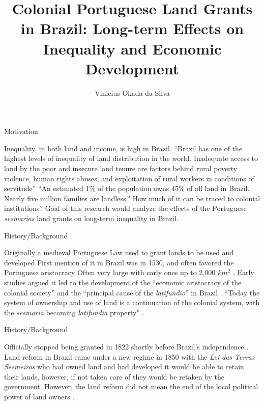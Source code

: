 \documentclass[aspectratio=1610, handout]{beamer}
\title{Colonial Portuguese Land Grants in Brazil: Long-term Effects on Inequality and Economic Development}
\author{Vinicius Okada da Silva}
\institute{The University of Illinois at Urbana-Champaign}
\date{}
\begin{document}
\begin{frame}
	\titlepage
\end{frame}

\begin{frame}{Motivation}
    \begin{outline}
        \1 Inequality, in both land and income, is high in Brazil.
            \2 ``Brazil has one of the highest levels of inequality of land distribution in the world. Inadequate access to land by the poor and insecure land tenure are factors behind rural poverty violence, human rights abuses, and exploitation of rural workers in conditions of servitude'' \parencite{Usaid2016-xs}
            \2 ``An estimated 1\% of the population owns 45\% of all land in Brazil. Nearly five million families are landless.'' \parencite{Usaid2016-xs}
        \pause 
        \1 How much of it can be traced to colonial institutions?
            \2 Goal of this research would analyze the effects of the Portuguese \textit{sesmarias} land grants on long-term inequality in Brazil.
    \end{outline}
\end{frame}

\begin{frame}{History/Background}
    \begin{outline}
        \1 Originally a medieval Portuguese Law used to grant lands to be used and developed \parencite[p.~16]{Diegues_Junior1959-ba}
        \1 First mention of it in Brazil was in 1530, and often favored the Portuguese aristocracy \parencites[p.~16]{Diegues_Junior1959-ba}{Lobb1976-mc}
            \2 Often very large with early ones up to 2,000 $km^2$ \parencite{Nozoe2006-hj}.
            \2 Early studies argued it led to the development of the ``economic aristocracy of the colonial society'' and the ``principal cause of the \textit{latifundio}'' in Brazil \parencites[p.~36]{Lima2002-kd}[p.~48]{Da_Costa_Porto1979-dz}.
            \2 ``Today the system of ownership and use of land is a continuation of the colonial system, with the \textit{sesmaria} becoming \textit{latifundia} property" \parencite[p.~18]{Andrade1980-md}.
    \end{outline}
\end{frame}

\begin{frame}{History/Background}
    \begin{outline}
        \1 Officially stopped being granted in 1822 shortly before Brazil's independence \parencite{Silva2019-vj}. 
        \1 Land reform in Brazil came under a new regime in 1850 with the \textit{Lei das Terras} \parencite[p.~148]{Da_Costa_Porto1979-dz}
            \2 \textit{Sesmeiros} who had owned land and had developed it would be able to retain their lands, however, if not taken care of they would be retaken by the government.
            \2 However, the land reform did not mean the end of the local political power of land owners \parencite{Motta1998-xw}.
    \end{outline}    
\end{frame}
\end{document}
